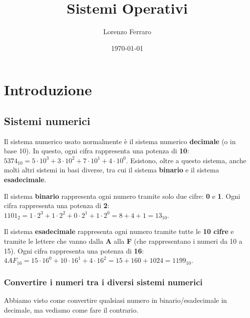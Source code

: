 \documentclass[11pt, a4paper, titlepage, oneside]{scrbook}
\title{Sistemi Operativi}
\author{Lorenzo Ferraro}
\date{\today}
\begin{document}
\frontmatter
\SapienzaCoverItalianoTriennale
\InfoSegnalazioni

\tableofcontents

\mainmatter

\chapter{Introduzione}

\section{Sistemi numerici}

Il sistema numerico usato normalmente è il sistema numerico \textbf{decimale} (o in base 10). In questo, ogni cifra rappresenta una potenza di \textbf{10}: $5374_{10} = 5 \cdot 10^3 + 3 \cdot 10^2 + 7 \cdot 10^1 + 4 \cdot 10^0$. Esistono, oltre a questo sistema, anche molti altri sistemi in basi diverse, tra cui il sistema \textbf{binario} e il sistema \textbf{esadecimale}.

\begin{Definizione}
\label{def-sistema-binario}
Il sistema \textbf{binario} rappresenta ogni numero tramite solo due cifre: \textbf{0} e \textbf{1}. Ogni cifra rappresenta una potenza di \textbf{2}: $1101_2 = 1 \cdot 2^3 + 1 \cdot 2^2 + 0 \cdot 2^1 + 1 \cdot 2^0 = 8 + 4 + 1 = 13_{10}$. 
\end{Definizione}

\begin{Definizione}
\label{def-sistema-esadecimale}
Il sistema \textbf{esadecimale} rappresenta ogni numero tramite tutte le \textbf{10 cifre} e tramite le lettere che vanno dalla \textbf{A} alla \textbf{F} (che rappresentano i numeri da 10 a 15). Ogni cifra rappresenta una potenza di \textbf{16}: $4AF_{16} = 15 \cdot 16^0 + 10 \cdot 16^1 + 4 \cdot 16^2 =  15 + 160 + 1024 = 1199_{10}$.
\end{Definizione}

\subsection{Convertire i numeri tra i diversi sistemi numerici}

Abbiamo visto come convertire qualsiasi numero in binario/esadecimale in decimale, ma vediamo come fare il contrario.
\end{document}
